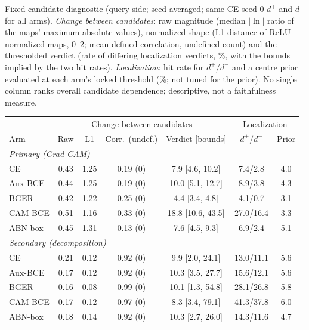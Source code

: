 \begingroup
\captionsetup{type=table}
\centering\footnotesize\setlength{\tabcolsep}{2.4pt}
\caption{Fixed-candidate diagnostic (query side; seed-averaged; same CE-seed-0 $d^+$ and $d^-$ for all arms). \emph{Change between candidates}: raw magnitude (median $|\ln|$ ratio of the maps' maximum absolute values), normalized shape (L1 distance of ReLU-normalized maps, 0--2; mean defined correlation, undefined count) and the thresholded verdict (rate of differing localization verdicts, \%, with the bounds implied by the two hit rates). \emph{Localization}: hit rate for $d^+/d^-$ and a centre prior evaluated at each arm's locked threshold (\%; not tuned for the prior). No single column ranks overall candidate dependence; descriptive, not a faithfulness measure.}
\label{tab:osld-a5}
\begin{tabular}{lcccccc}
\toprule
& \multicolumn{4}{c}{Change between candidates} & \multicolumn{2}{c}{Localization}\\
\cmidrule(lr){2-5}\cmidrule(lr){6-7}
Arm & Raw & L1 & Corr.\ (undef.) & Verdict [bounds] & $d^+/d^-$ & Prior\\
\midrule
\multicolumn{7}{l}{\emph{Primary (Grad-CAM)}}\\
CE & 0.43 & 1.25 & 0.19 (0) & 7.9 [4.6, 10.2] & 7.4/2.8 & 4.0\\
Aux-BCE & 0.44 & 1.25 & 0.19 (0) & 10.0 [5.1, 12.7] & 8.9/3.8 & 4.3\\
BGER & 0.42 & 1.22 & 0.25 (0) & 4.4 [3.4, 4.8] & 4.1/0.7 & 3.1\\
CAM-BCE & 0.51 & 1.16 & 0.33 (0) & 18.8 [10.6, 43.5] & 27.0/16.4 & 3.3\\
ABN-box & 0.45 & 1.31 & 0.13 (0) & 7.6 [4.5, 9.3] & 6.9/2.4 & 5.1\\
\multicolumn{7}{l}{\emph{Secondary (decomposition)}}\\
CE & 0.21 & 0.12 & 0.92 (0) & 9.9 [2.0, 24.1] & 13.0/11.1 & 5.6\\
Aux-BCE & 0.17 & 0.12 & 0.92 (0) & 10.3 [3.5, 27.7] & 15.6/12.1 & 5.6\\
BGER & 0.16 & 0.08 & 0.99 (0) & 10.1 [1.3, 54.8] & 28.1/26.8 & 5.8\\
CAM-BCE & 0.17 & 0.12 & 0.97 (0) & 8.3 [3.4, 79.1] & 41.3/37.8 & 6.0\\
ABN-box & 0.18 & 0.14 & 0.92 (0) & 10.3 [2.7, 26.0] & 14.3/11.6 & 4.7\\
\bottomrule
\end{tabular}
\par
\endgroup
